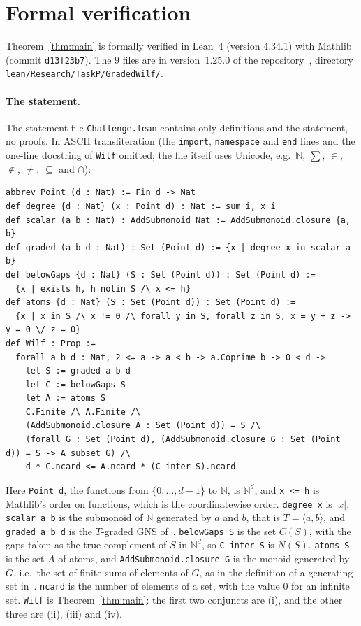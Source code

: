 \documentclass[11pt]{article}
\theoremstyle{definition}
\theoremstyle{remark}
\newcommand{\repoversion}{1.25.0}
\newcommand{\N}{\mathbb N}
\begin{document}
{\sloppy
\section{Formal verification}\label{sec:lean}

Theorem~\ref{thm:main} is formally verified in Lean~4 (version 4.34.1) with
Mathlib~\cite{mathlib} (commit \texttt{d13f23b7}). The $9$ files are in
version~\repoversion{} of the repository~\cite{repo}, directory
\texttt{lean/Research/TaskP/GradedWilf/}.

\paragraph{The statement.}
The statement file \texttt{Challenge.lean} contains only definitions and the
statement, no proofs. In ASCII transliteration (the \texttt{import},
\texttt{namespace} and \texttt{end} lines and the one-line docstring of
\texttt{Wilf} omitted; the file itself uses Unicode, e.g.\ $\mathbb N$, $\sum$,
$\in$, $\notin$, $\ne$, $\subseteq$ and $\cap$):
{\footnotesize
\begin{verbatim}
abbrev Point (d : Nat) := Fin d -> Nat
def degree {d : Nat} (x : Point d) : Nat := sum i, x i
def scalar (a b : Nat) : AddSubmonoid Nat := AddSubmonoid.closure {a, b}
def graded (a b d : Nat) : Set (Point d) := {x | degree x in scalar a b}
def belowGaps {d : Nat} (S : Set (Point d)) : Set (Point d) :=
  {x | exists h, h notin S /\ x <= h}
def atoms {d : Nat} (S : Set (Point d)) : Set (Point d) :=
  {x | x in S /\ x != 0 /\ forall y in S, forall z in S, x = y + z -> y = 0 \/ z = 0}
def Wilf : Prop :=
  forall a b d : Nat, 2 <= a -> a < b -> a.Coprime b -> 0 < d ->
    let S := graded a b d
    let C := belowGaps S
    let A := atoms S
    C.Finite /\ A.Finite /\
    (AddSubmonoid.closure A : Set (Point d)) = S /\
    (forall G : Set (Point d), (AddSubmonoid.closure G : Set (Point d)) = S -> A subset G) /\
    d * C.ncard <= A.ncard * (C inter S).ncard
\end{verbatim}}
\noindent Here \texttt{Point d}, the functions from $\{0,\dots,d-1\}$ to $\N$,
is $\N^d$, and \texttt{x <= h} is Mathlib's order on functions, which is the
coordinatewise order. \texttt{degree x} is $|x|$, \texttt{scalar a b} is the
submonoid of $\N$ generated by $a$ and $b$, that is $T=\langle a,b\rangle$, and
\texttt{graded a b d} is the $T$-graded GNS of~\cite[Definition~4.1]{cn}.
\texttt{belowGaps S} is the set $C(S)$, with the gaps taken as the true
complement of $S$ in $\N^d$, so \texttt{C inter S} is $N(S)$. \texttt{atoms S}
is the set $A$ of atoms, and \texttt{AddSubmonoid.closure G} is the monoid
generated by $G$, i.e.\ the set of finite sums of elements of $G$, as in the
definition of a generating set in~\cite[§2]{cn}. \texttt{ncard} is the number of
elements of a set, with the value $0$ for an infinite set. \texttt{Wilf} is
Theorem~\ref{thm:main}: the first two conjuncts are (i), and the other three are
(ii), (iii) and (iv).

}
\end{document}
